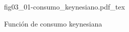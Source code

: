 \begin{figure}[h]
\centering
\def\svgwidth{0.5\textwidth}
{fig03_01-consumo_keynesiano.pdf_tex}
\caption{Función de consumo keynesiana}
\label{fig03_01-consumo_keynesiano}
\end{figure}